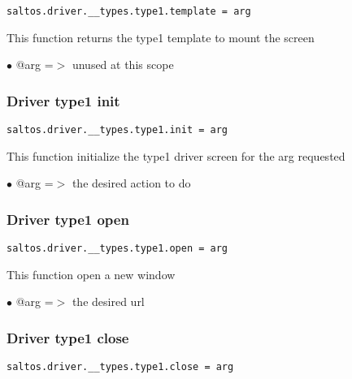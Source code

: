 \documentclass[a4paper]{article}
\begin{document}
\begin{lstlisting}
saltos.driver.__types.type1.template = arg
\end{lstlisting}

This function returns the type1 template to mount the screen

\begin{compactitem}
\item[\color{myblue}$\bullet$] @arg =$>$ unused at this scope
\end{compactitem}

\hypertarget{toc741}{}
\subsubsection{Driver type1 init}

\begin{lstlisting}
saltos.driver.__types.type1.init = arg
\end{lstlisting}

This function initialize the type1 driver screen for the arg requested

\begin{compactitem}
\item[\color{myblue}$\bullet$] @arg =$>$ the desired action to do
\end{compactitem}

\hypertarget{toc742}{}
\subsubsection{Driver type1 open}

\begin{lstlisting}
saltos.driver.__types.type1.open = arg
\end{lstlisting}

This function open a new window

\begin{compactitem}
\item[\color{myblue}$\bullet$] @arg =$>$ the desired url
\end{compactitem}

\hypertarget{toc743}{}
\subsubsection{Driver type1 close}

\begin{lstlisting}
saltos.driver.__types.type1.close = arg
\end{lstlisting}
\end{document}
